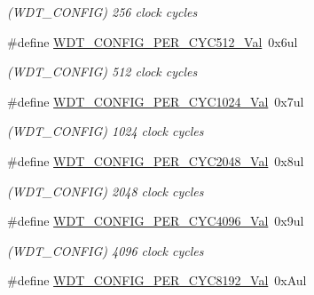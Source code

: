 \begin{DoxyCompactItemize}
\begin{DoxyCompactList}\small\item\em (W\+D\+T\+\_\+\+C\+O\+N\+F\+I\+G) 256 clock cycles \end{DoxyCompactList}\item 
\hypertarget{group___s_a_m_l21___w_d_t_ga9d9e62b7d1fd5df1ec6e15f0546ea76b}{}\#define \hyperlink{group___s_a_m_l21___w_d_t_ga9d9e62b7d1fd5df1ec6e15f0546ea76b}{W\+D\+T\+\_\+\+C\+O\+N\+F\+I\+G\+\_\+\+P\+E\+R\+\_\+\+C\+Y\+C512\+\_\+\+Val}~0x6ul\label{group___s_a_m_l21___w_d_t_ga9d9e62b7d1fd5df1ec6e15f0546ea76b}

\begin{DoxyCompactList}\small\item\em (W\+D\+T\+\_\+\+C\+O\+N\+F\+I\+G) 512 clock cycles \end{DoxyCompactList}\item 
\hypertarget{group___s_a_m_l21___w_d_t_ga987e1fd45b91a9fbb1f543c80c8d13c4}{}\#define \hyperlink{group___s_a_m_l21___w_d_t_ga987e1fd45b91a9fbb1f543c80c8d13c4}{W\+D\+T\+\_\+\+C\+O\+N\+F\+I\+G\+\_\+\+P\+E\+R\+\_\+\+C\+Y\+C1024\+\_\+\+Val}~0x7ul\label{group___s_a_m_l21___w_d_t_ga987e1fd45b91a9fbb1f543c80c8d13c4}

\begin{DoxyCompactList}\small\item\em (W\+D\+T\+\_\+\+C\+O\+N\+F\+I\+G) 1024 clock cycles \end{DoxyCompactList}\item 
\hypertarget{group___s_a_m_l21___w_d_t_ga67b3ace504ea66ff9716a81fe4ffa566}{}\#define \hyperlink{group___s_a_m_l21___w_d_t_ga67b3ace504ea66ff9716a81fe4ffa566}{W\+D\+T\+\_\+\+C\+O\+N\+F\+I\+G\+\_\+\+P\+E\+R\+\_\+\+C\+Y\+C2048\+\_\+\+Val}~0x8ul\label{group___s_a_m_l21___w_d_t_ga67b3ace504ea66ff9716a81fe4ffa566}

\begin{DoxyCompactList}\small\item\em (W\+D\+T\+\_\+\+C\+O\+N\+F\+I\+G) 2048 clock cycles \end{DoxyCompactList}\item 
\hypertarget{group___s_a_m_l21___w_d_t_ga50edfcd24c0430413186fc6794354abb}{}\#define \hyperlink{group___s_a_m_l21___w_d_t_ga50edfcd24c0430413186fc6794354abb}{W\+D\+T\+\_\+\+C\+O\+N\+F\+I\+G\+\_\+\+P\+E\+R\+\_\+\+C\+Y\+C4096\+\_\+\+Val}~0x9ul\label{group___s_a_m_l21___w_d_t_ga50edfcd24c0430413186fc6794354abb}

\begin{DoxyCompactList}\small\item\em (W\+D\+T\+\_\+\+C\+O\+N\+F\+I\+G) 4096 clock cycles \end{DoxyCompactList}\item 
\hypertarget{group___s_a_m_l21___w_d_t_gad72220cefef593dcdc0c97430cdd381b}{}\#define \hyperlink{group___s_a_m_l21___w_d_t_gad72220cefef593dcdc0c97430cdd381b}{W\+D\+T\+\_\+\+C\+O\+N\+F\+I\+G\+\_\+\+P\+E\+R\+\_\+\+C\+Y\+C8192\+\_\+\+Val}~0x\+Aul\label{group___s_a_m_l21___w_d_t_gad72220cefef593dcdc0c97430cdd381b}


\end{DoxyCompactItemize}
